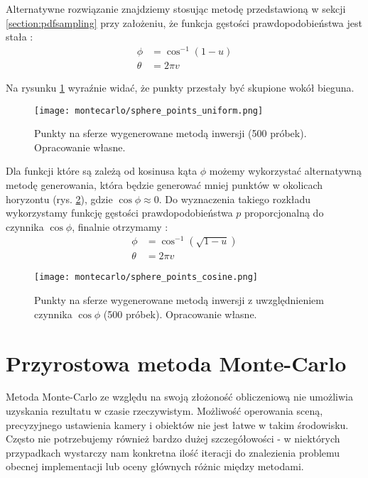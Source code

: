 \documentclass[../main.tex]{subfiles}
\begin{document}
Alternatywne rozwiązanie znajdziemy stosując metodę przedstawioną w sekcji \ref{section:pdfsampling}  przy założeniu, że funkcja gęstości prawdopodobieństwa jest stała \cite{dammertz_2012, AdvancedCGRenderingEq}:
\begin{equation}	
\begin{aligned}
	\phi &= \cos^{-1}(1-u) \\
	\theta &= 2 \pi v
\end{aligned}
\end{equation}

Na rysunku \ref{fig:SpherePointsUniform} wyraźnie widać, że punkty przestały być skupione wokół bieguna.

\begin{figure}[h]
    \centering
    \texttt{[image: montecarlo/sphere\_points\_uniform.png]}
    \caption{Punkty na sferze wygenerowane metodą inwersji (500 próbek). Opracowanie własne.}
    \label{fig:SpherePointsUniform}
\end{figure}

Dla funkcji które są zależą od kosinusa kąta $\phi$ możemy wykorzystać alternatywną metodę generowania, która będzie generować mniej punktów w okolicach horyzontu (rys. \ref{fig:SpherePointsCosine}), gdzie $\cos\phi \approx 0$. Do wyznaczenia takiego rozkładu wykorzystamy funkcję gęstości prawdopodobieństwa $p$ proporcjonalną do czynnika $\cos \phi$, finalnie otrzymamy \cite{AdvancedCGRenderingEq}:
\begin{equation}	
\begin{aligned}
  \phi &= \cos^{-1}(\sqrt{1-u}) \\
  \theta &= 2 \pi v
\end{aligned}
\end{equation}

\begin{figure}[h]
    \centering
    \texttt{[image: montecarlo/sphere\_points\_cosine.png]}
    \caption{Punkty na sferze wygenerowane metodą inwersji z uwzględnieniem czynnika $\cos\phi$ (500 próbek). Opracowanie własne.}
    \label{fig:SpherePointsCosine}
\end{figure}

\section{Przyrostowa metoda Monte-Carlo}

Metoda Monte-Carlo ze względu na swoją złożoność obliczeniową nie umożliwia uzyskania rezultatu w czasie rzeczywistym. Możliwość operowania sceną, precyzyjnego ustawienia kamery i obiektów nie jest łatwe w takim środowisku. Często nie potrzebujemy również bardzo dużej szczegółowości - w niektórych przypadkach wystarczy nam konkretna ilość iteracji do znalezienia problemu obecnej implementacji lub oceny głównych różnic między metodami.
\end{document}
